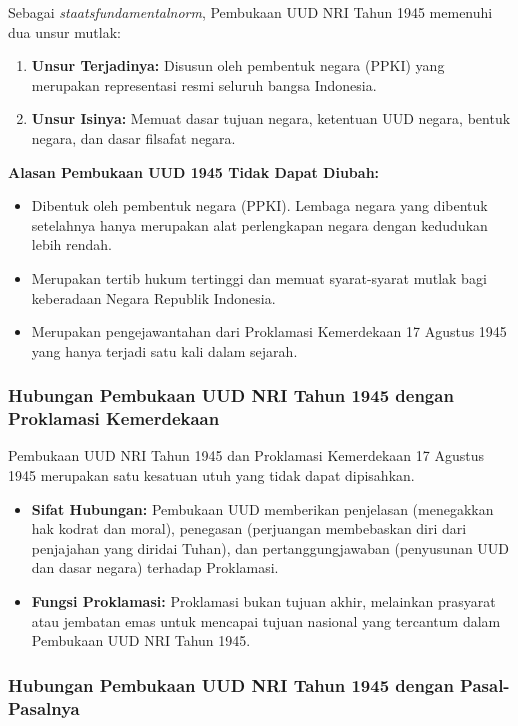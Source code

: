Sebagai \textit{staatsfundamentalnorm}, Pembukaan UUD NRI Tahun 1945 memenuhi dua unsur mutlak:
\begin{enumerate}
\item \textbf{Unsur Terjadinya:} Disusun oleh pembentuk negara (PPKI) yang merupakan representasi resmi seluruh bangsa Indonesia.
\item \textbf{Unsur Isinya:} Memuat dasar tujuan negara, ketentuan UUD negara, bentuk negara, dan dasar filsafat negara.
\end{enumerate}

\textbf{Alasan Pembukaan UUD 1945 Tidak Dapat Diubah:}
\begin{itemize}
\item Dibentuk oleh pembentuk negara (PPKI). Lembaga negara yang dibentuk setelahnya hanya merupakan alat perlengkapan negara dengan kedudukan lebih rendah.
\item Merupakan tertib hukum tertinggi dan memuat syarat-syarat mutlak bagi keberadaan Negara Republik Indonesia.
\item Merupakan pengejawantahan dari Proklamasi Kemerdekaan 17 Agustus 1945 yang hanya terjadi satu kali dalam sejarah.
\end{itemize}

\subsubsection{Hubungan Pembukaan UUD NRI Tahun 1945 dengan Proklamasi Kemerdekaan}

Pembukaan UUD NRI Tahun 1945 dan Proklamasi Kemerdekaan 17 Agustus 1945 merupakan satu kesatuan utuh yang tidak dapat dipisahkan.
\begin{itemize}
\item \textbf{Sifat Hubungan:} Pembukaan UUD memberikan penjelasan (menegakkan hak kodrat dan moral), penegasan (perjuangan membebaskan diri dari penjajahan yang diridai Tuhan), dan pertanggungjawaban (penyusunan UUD dan dasar negara) terhadap Proklamasi.
\item \textbf{Fungsi Proklamasi:} Proklamasi bukan tujuan akhir, melainkan prasyarat atau jembatan emas untuk mencapai tujuan nasional yang tercantum dalam Pembukaan UUD NRI Tahun 1945.
\end{itemize}

\subsubsection{Hubungan Pembukaan UUD NRI Tahun 1945 dengan Pasal-Pasalnya}

